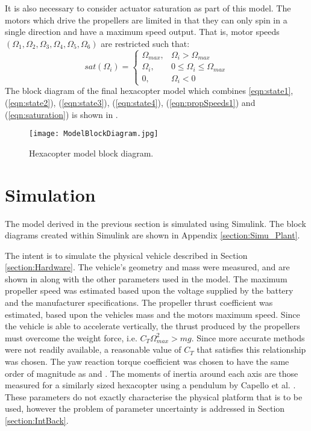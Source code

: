 It is also necessary to consider actuator saturation as part of this model. The motors which drive the propellers are limited in that they can only spin in a single direction and have a maximum speed output. That is, motor speeds $(\Omega_{1},\Omega_{2},\Omega_{3},\Omega_{4},\Omega_{5},\Omega_{6})$ are restricted such that:
\begin{equation}\label{eqn:saturation}
sat(\Omega_{i})=\begin{cases}
      \Omega_{max}, & \Omega_{i}>\Omega_{max}\\
      \Omega_{i}, & 0\leq\Omega_{i}\leq\Omega_{max}\\
      0, & \Omega_{i}<0
    \end{cases} 
\end{equation}
The block diagram of the final hexacopter model which combines \eqref{eqn:state1}, (\ref{eqn:state2}), (\ref{eqn:state3}), (\ref{eqn:state4}), (\ref{eqn:propSpeeds1}) and (\ref{eqn:saturation}) is shown in .
\begin{figure}[htb]
\begin{center}
	\texttt{[image: ModelBlockDiagram.jpg]}%
	\end{center}
	\caption{Hexacopter model block diagram.}%
	\label{fig:FinalModel}%
\end{figure}

 
\section{Simulation}
The model derived in the previous section is simulated using Simulink. The block diagrams created within Simulink are shown in Appendix \ref{section:Simu_Plant}.

The intent is to simulate the physical vehicle described in Section \ref{section:Hardware}. The vehicle's geometry and mass were measured, and are shown in  along with the other parameters used in the model. The maximum propeller speed was estimated based upon the voltage supplied by the battery and the manufacturer specifications. The propeller thrust coefficient was estimated, based upon the vehicles mass and the motors maximum speed. Since the vehicle is able to accelerate vertically, the thrust produced by the propellers must overcome the weight force, i.e. $C_{T}\Omega_{max}^{2}>mg$. Since more accurate methods were not readily available, a reasonable value of $C_{T}$ that satisfies this relationship was chosen. The yaw reaction torque coefficient was chosen to have the same order of magnitude as \cite{Bouabdallah2006} and \cite{Tayebi2004}. The moments of inertia around each axis are those measured for a similarly sized hexacopter using a pendulum by Capello et al. \cite{Capello2015}. These parameters do not exactly characterise the physical platform that is to be used, however the problem of parameter uncertainty is addressed in Section \ref{section:IntBack}.

